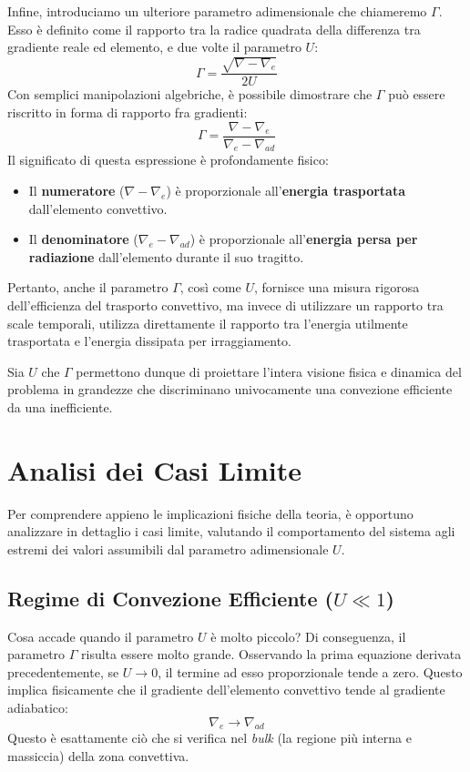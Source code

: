 Infine, introduciamo un ulteriore parametro adimensionale che chiameremo $\Gamma$. Esso è definito come il rapporto tra la radice quadrata della differenza tra gradiente reale ed elemento, e due volte il parametro $U$:
\begin{equation}
\Gamma = \frac{\sqrt{\nabla - \nabla_{e}}}{2U}
\end{equation}
Con semplici manipolazioni algebriche, è possibile dimostrare che $\Gamma$ può essere riscritto in forma di rapporto fra gradienti:
\begin{equation}
\Gamma = \frac{\nabla - \nabla_{e}}{\nabla_{e} - \nabla_{ad}}
\end{equation}
Il significato di questa espressione è profondamente fisico:
\begin{itemize}
\item Il \textbf{numeratore} ($\nabla - \nabla_{e}$) è proporzionale all'\textbf{energia trasportata} dall'elemento convettivo.
\item Il \textbf{denominatore} ($\nabla_{e} - \nabla_{ad}$) è proporzionale all'\textbf{energia persa per radiazione} dall'elemento durante il suo tragitto.
\end{itemize}
Pertanto, anche il parametro $\Gamma$, così come $U$, fornisce una misura rigorosa dell'efficienza del trasporto convettivo, ma invece di utilizzare un rapporto tra scale temporali, utilizza direttamente il rapporto tra l'energia utilmente trasportata e l'energia dissipata per irraggiamento.

Sia $U$ che $\Gamma$ permettono dunque di proiettare l'intera visione fisica e dinamica del problema in grandezze che discriminano univocamente una convezione efficiente da una inefficiente.

\section{Analisi dei Casi Limite}

Per comprendere appieno le implicazioni fisiche della teoria, è opportuno analizzare in dettaglio i casi limite, valutando il comportamento del sistema agli estremi dei valori assumibili dal parametro adimensionale $U$.

\subsection{Regime di Convezione Efficiente ($U \ll 1$)}

Cosa accade quando il parametro $U$ è molto piccolo? Di conseguenza, il parametro $\Gamma$ risulta essere molto grande.
Osservando la prima equazione derivata precedentemente, se $U \to 0$, il termine ad esso proporzionale tende a zero. Questo implica fisicamente che il gradiente dell'elemento convettivo tende al gradiente adiabatico:
\begin{equation}
\nabla_{e} \to \nabla_{ad}
\end{equation}
Questo è esattamente ciò che si verifica nel \textit{bulk} (la regione più interna e massiccia) della zona convettiva.

